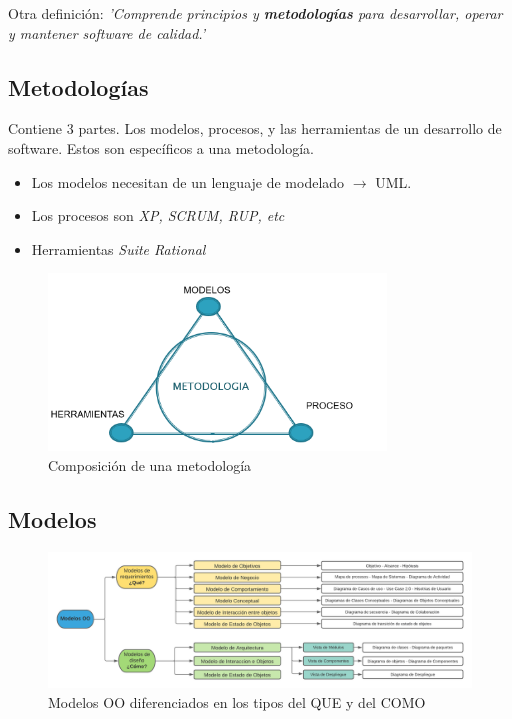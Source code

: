 \documentclass[titlepage,a4paper]{article}
\begin{document}
\medskip

Otra definición: \textit{'Comprende principios y \textbf{metodologías} para desarrollar, operar y mantener software de calidad.'}


\subsection{Metodologías}
Contiene 3 partes. Los modelos, procesos, y las herramientas de un desarrollo de software. Estos son específicos a una metodología.

    \begin{itemize}
        \item Los modelos necesitan de un lenguaje de modelado $\rightarrow$ UML.
        \item Los procesos son \textit{XP, SCRUM, RUP, etc}
        \item Herramientas \textit{Suite Rational}
    \end{itemize}
    
    \begin{figure}[!htb]
        \centering
        \includegraphics[width=0.8\textwidth]{Imagenes/Metodologias.png}
        \caption{Composición de una metodología}
    \end{figure}

\subsection{Modelos}


\begin{figure}[!htb]
    \centering
    \hspace*{-2.8cm}
    \includegraphics[width=1.3\textwidth]{Imagenes/ModelosOO.png}
    \caption{Modelos OO diferenciados en los tipos del QUE y del COMO}
\end{figure}
\end{document}
